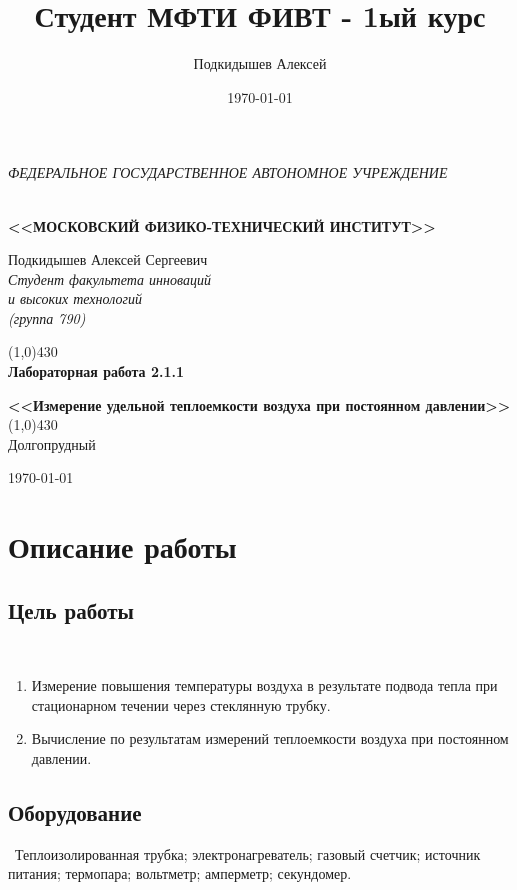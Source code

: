 \documentclass[a4paper,12pt]{article}
\author{Подкидышев Алексей}
\title{Студент МФТИ ФИВТ - 1ый курс}
\date{\today}
\theoremstyle{plain} %
\theoremstyle{definition} %
\theoremstyle{remark} %
\renewcommand{\headrulewidth}{0mm}  %
\begin{document}


\begin{center}
	\textit{\MakeTextUppercase{федеральное государственное автономное учреждение}}
		
	\vspace{0.5ex}
	
	\textbf{ \\ \MakeTextUppercase{<<Московский Физико-технический институт>>}}
\end{center}
\vspace{13ex}
\begin{flushright}
	\noindent
	{Подкидышев Алексей Сергеевич}
	\\
	\textit{Студент факультета инноваций\\ и высоких технологий\\(группа 790)}
\end{flushright}
\begin{center}
	\vspace{23ex}
	\line(1,0){430}\\[4ex]
	{\LARGE\textbf{Лабораторная работа 2.1.1}}
	\vspace{2ex}
	
		
	\textbf{\large{<<Измерение удельной теплоемкости воздуха при постоянном давлении>>}}\\[3ex]
	\line(1,0){430}\\[5ex]
	\vfill
	Долгопрудный 
	
	{\today}
\end{center}

\newpage
\renewcommand{\headrulewidth}{1pt}

\section{Описание работы}
\subsection{Цель работы}\
\begin{enumerate}
\item Измерение повышения температуры воздуха в результате подвода    тепла   при   стационарном   течении   через   стеклянную  трубку.

\item
Вычисление по результатам измерений теплоемкости воздуха при постоянном давлении.
\end{enumerate}

\subsection{Оборудование}\
\indent Теплоизолированная трубка; электронагреватель; газовый счетчик; источник питания; термопара; вольтметр; амперметр; секундомер.
\end{document}
